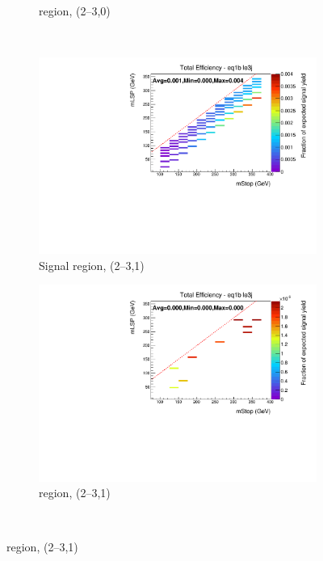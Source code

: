 \begin{figure}[ht!]
\begin{subfigure}[b]{0.47\textwidth}
    \caption{\mj region, (2--3,0)}
    \label{fig:t2cc_mu_eff_le3j_0b}
  \end{subfigure} \\
  \begin{subfigure}[b]{0.47\textwidth}
    \includegraphics[width=\textwidth, trim=0 0 0 24, clip=true]{Figs/sms/t2cc/v24/T2cc_v24_had_eff_maps_eq1b_le3j_SITV.pdf}
    \caption{Signal region, (2--3,1)}
    \label{fig:t2cc_sig_eff_le3j_1b}
  \end{subfigure}
  \begin{subfigure}[b]{0.47\textwidth}
    \includegraphics[width=\textwidth, trim=0 0 0 24, clip=true]{Figs/sms/t2cc/v24/T2cc_v24_muon_eff_maps_eq1b_le3j_SITV.pdf}
    \caption{\mj region, (2--3,1)}
    \label{fig:t2cc_mu_eff_le3j_1b}
  \end{subfigure} \\

\end{figure}
